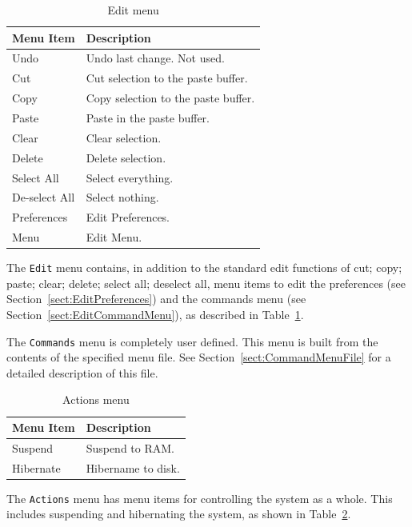 \begin{table}[hbpt]
\begin{centering}
\begin{tabular}{|l|p{3in}|}
\hline
Menu Item & Description \\
\hline
\hline
Undo & Undo last change.  Not used. \\
\hline
Cut & Cut selection to the paste buffer. \\
\hline
Copy & Copy selection to the paste buffer. \\
\hline
Paste & Paste in the paste buffer. \\
\hline
Clear & Clear selection. \\
\hline
Delete & Delete selection. \\
\hline
Select All & Select everything. \\
\hline
De-select All & Select nothing. \\
\hline
Preferences & Edit Preferences. \\
\hline
Menu & Edit Menu. \\
\hline
\end{tabular}
\caption{Edit menu}
\label{ref:tab:editmenu}
\end{centering}
\end{table}
The \texttt{Edit} menu contains, in addition to the standard edit
functions of cut; copy; paste; clear; delete; select all; deselect all,
menu items to edit the preferences (see
Section~\ref{sect:EditPreferences}) and the commands menu (see
Section~\ref{sect:EditCommandMenu}), as described in Table~\ref{ref:tab:editmenu}.

The \texttt{Commands} menu is completely user defined.  This menu is
built from the contents of the specified menu file.  See
Section~\ref{sect:CommandMenuFile} for a detailed description of this
file.

\begin{table}[hbpt]
\begin{centering}
\begin{tabular}{|l|p{3in}|}
\hline
Menu Item & Description \\   
\hline
\hline
Suspend & Suspend to RAM. \\
\hline
Hibernate & Hibername to disk. \\
\hline
\end{tabular}
\caption{Actions menu}
\label{ref:tab:actionsmenu}
\end{centering}
\end{table}
The \texttt{Actions} menu has menu items for controlling the system as a
whole. This includes suspending and hibernating the system, as shown in
Table~\ref{ref:tab:actionsmenu}. 

